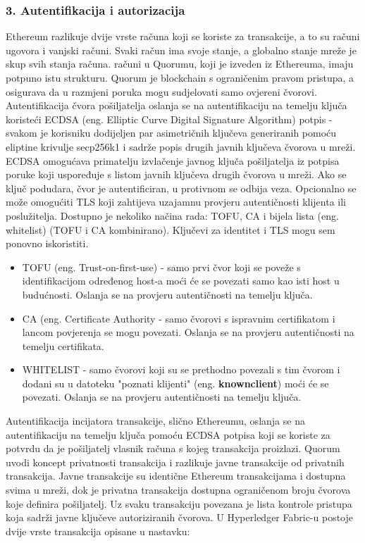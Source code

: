 \documentclass[times, utf8, diplomski]{fer}
\begin{document}
\subsubsection{3. Autentifikacija i autorizacija}
Ethereum razlikuje dvije vrste računa koji se koriste za transakcije, a to su računi ugovora i vanjski računi. Svaki račun ima svoje stanje, a globalno stanje mreže je skup svih stanja računa. računi u Quorumu, koji je izveden iz Ethereuma, imaju potpuno istu strukturu. Quorum je blockchain s ograničenim pravom pristupa, a osigurava da u razmjeni poruka mogu sudjelovati samo ovjereni čvorovi. Autentifikacija čvora pošiljatelja oslanja se na autentifikaciju na temelju ključa koristeći ECDSA (eng. Elliptic Curve Digital Signature Algorithm) potpis - svakom je korisniku dodijeljen par asimetričnih ključeva generiranih pomoću eliptine krivulje secp256k1 i sadrže popis drugih javnih ključeva čvorova u mreži.  \cite{johnson2001elliptic} ECDSA omogućava primatelju izvlačenje javnog ključa pošiljatelja iz potpisa poruke koji uspoređuje s listom javnih ključeva drugih čvorova u mreži. Ako se ključ podudara, čvor je autentificiran, u protivnom se odbija veza. Opcionalno se može omogućiti TLS koji zahtijeva uzajamnu provjeru autentičnosti klijenta ili poslužitelja. Dostupno je nekoliko načina rada: TOFU, CA i bijela lista (eng. whitelist) (TOFU i CA kombinirano). Ključevi za identitet i TLS mogu sem ponovno iskoristiti.

\begin{itemize}

\item TOFU (eng. Trust-on-first-use) - samo prvi čvor koji se poveže s identifikacijom određenog host-a moći će se povezati samo kao isti host u budućnosti. Oslanja se na provjeru autentičnosti na temelju ključa.

\item CA (eng. Certificate Authority - samo čvorovi s ispravnim certifikatom i lancom povjerenja se mogu povezati. Oslanja se na provjeru autentičnosti na temelju certifikata.

\item WHITELIST - samo čvorovi koji su se prethodno povezali s tim čvorom i dodani su u datoteku "poznati klijenti" (eng. \textbf{knownclient}) moći će se povezati.  Oslanja se na provjeru autentičnosti na temelju ključa.

\end{itemize}

Autentifikacija incijatora transakcije, slično Ethereumu, oslanja se na autentifikaciju na temelju ključa pomoću ECDSA potpisa koji se koriste za potvrdu da je pošiljatelj vlasnik računa s kojeg transakcija proizlazi. Quorum uvodi koncept privatnosti transakcija i razlikuje javne transakcije od privatnih transakcija. Javne transakcije su identične Ethereum transakcijama i dostupna svima u mreži, dok je privatna transakcija dostupna ograničenom broju čvorova koje definira pošiljatelj. Uz svaku transakciju povezana je lista kontrole pristupa koja sadrži javne ključeve autoriziranih čvorova.
U Hyperledger Fabric-u postoje dvije vrste transakcija opisane u nastavku:
\end{document}
